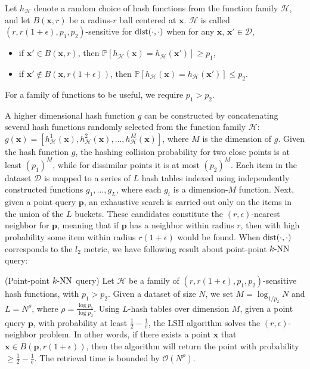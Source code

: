 \begin{definition}
\label{def:3:lsh}
  \cite{Andoni:2008:NHA} Let $h_{\mathcal H}$ denote a random choice of hash functions from the function family $\mathcal H$, and let $B(\mathbf x, r)$ be a radius-$r$ ball centered at $\mathbf x$.  $\mathcal H$ is called $(r, r(1+\epsilon), p_1, p_2)$-sensitive for $\operatorname{dist}(\cdot, \cdot)$ when for any $\mathbf x$, $\mathbf x' \in \mathcal D$,
  \begin{itemize}
  \item if $\mathbf x' \in B(\mathbf x, r)$, then $\mathbb P[h_{\mathcal H}(\mathbf x) = h_{\mathcal H}(\mathbf x')] \geq p_1$,
  \item if $\mathbf x' \notin B(\mathbf x, r(1+\epsilon))$, then $\mathbb P[h_{\mathcal H}(\mathbf x) = h_{\mathcal H}(\mathbf x')] \leq p_2$.
  \end{itemize}
\end{definition}
For a family of functions to be useful, we require $p_1 > p_2$.

A higher dimensional hash function $g$ can be constructed by concatenating several hash functions randomly selected from the function family $\mathcal H$: $g(\mathbf x) = [h_{\mathcal H}^{1}(\mathbf x), h_{\mathcal H}^{2}(\mathbf x), ..., h_{\mathcal H}^{M}(\mathbf x)]$, where $M$ is the dimension of $g$.
Given the hash function $g$, the hashing collision probability for two close points is at least $(p_1)^M$, while for dissimilar points it is at most $(p_2)^M$. Each item in the dataset $\mathcal D$ is mapped to a series of $L$ hash tables indexed using independently constructed functions $g_1, ..., g_L$, where each $g_i$ is a dimension-$M$ function. Next, given a point query $\mathbf p$, an exhaustive search is carried out only on the items in the union of the $L$ buckets. These candidates constitute the $(r,\epsilon)$-nearest neighbor for $\mathbf p$, meaning that if $\mathbf p$ has a neighbor within radius $r$, then with high probability some item within radius $r(1+\epsilon)$ would be found. When $\operatorname{dist}(\cdot, \cdot)$ corresponds to the $l_2$ metric, we have following result about point-point $k\text{-NN}$ query:
\begin{theorem}
  \label{thm:3:pplsh}
  (Point-point $k\text{-NN}$ query) \cite{Datar:2004:LHS} Let $\mathcal H$ be a family of $(r, r(1+\epsilon), p_1, p_2)$-sensitive hash functions, with $p_1 > p_2$. Given a dataset of size $N$, we set $M = \log_{1/p_2} N$ and $L = N^{\rho}$, where $\rho = \frac{\log p_1}{\log p_2}$. Using $L$-hash tables over dimension $M$, given a point query $\mathbf p$, with probability at least $\frac{1}{2} - \frac{1}{e}$, the LSH algorithm solves the $(r, \epsilon)$-neighbor problem. In other words, if there exists a point $\mathbf x$ that $\mathbf x \in B(\mathbf p, r(1+\epsilon))$, then the algorithm will return the point with probability $\geq \frac{1}{2} - \frac{1}{e}$. The retrieval time is bounded by $\mathcal O(N^{\rho})$.
\end{theorem}

